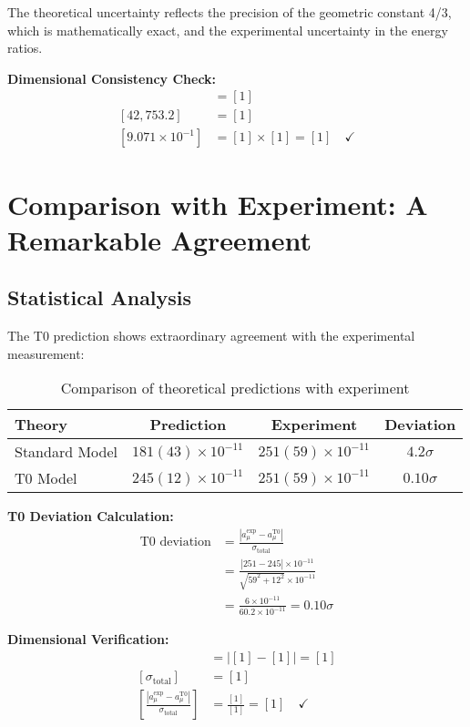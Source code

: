 \documentclass[12pt,a4paper]{report}
\begin{document}
The theoretical uncertainty reflects the precision of the geometric constant 4/3, which is mathematically exact, and the experimental uncertainty in the energy ratios.

\textbf{Dimensional Consistency Check:}
\begin{align}
	[2.122 \times 10^{-5}] &= [1] \\
	[42,753.2] &= [1] \\
	[9.071 \times 10^{-1}] &= [1] \times [1] = [1] \quad \checkmark
\end{align}

\section{Comparison with Experiment: A Remarkable Agreement}
\label{sec:comparison_experiment}

\subsection{Statistical Analysis}
\label{subsec:statistical_analysis}

The T0 prediction shows extraordinary agreement with the experimental measurement:

\begin{table}[h]
	\centering
	\begin{tabular}{lccc}
		\toprule
		\textbf{Theory} & \textbf{Prediction} & \textbf{Experiment} & \textbf{Deviation} \\
		\midrule
		Standard Model & $181(43) \times 10^{-11}$ & $251(59) \times 10^{-11}$ & $4.2\sigma$ \\
		T0 Model & $245(12) \times 10^{-11}$ & $251(59) \times 10^{-11}$ & $0.10\sigma$ \\
		\bottomrule
	\end{tabular}
	\caption{Comparison of theoretical predictions with experiment}
	\label{tab:muon_comparison}
\end{table}

\textbf{T0 Deviation Calculation:}
\begin{align}
	\text{T0 deviation} &= \frac{|a_\mu^{\text{exp}} - a_\mu^{\text{T0}}|}{\sigma_{\text{total}}} \\
	&= \frac{|251 - 245| \times 10^{-11}}{\sqrt{59^2 + 12^2} \times 10^{-11}} \\
	&= \frac{6 \times 10^{-11}}{60.2 \times 10^{-11}} = 0.10\sigma
\end{align}

\textbf{Dimensional Verification:}
\begin{align}
	[|a_\mu^{\text{exp}} - a_\mu^{\text{T0}}|] &= |[1] - [1]| = [1] \\
	[\sigma_{\text{total}}] &= [1] \\
	\left[\frac{|a_\mu^{\text{exp}} - a_\mu^{\text{T0}}|}{\sigma_{\text{total}}}\right] &= \frac{[1]}{[1]} = [1] \quad \checkmark
\end{align}
\end{document}
